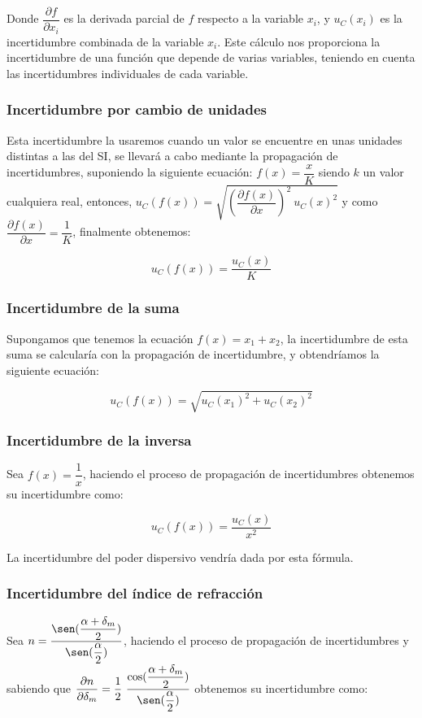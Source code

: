 \documentclass[10pt,onecolumn]{article}
\begin{document}
Donde $\dfrac{\partial f}{\partial x_i}$ es la derivada parcial de $f$ respecto a la variable $x_i$, y $u_C(x_i)$ es la incertidumbre combinada de la variable $x_i$.
Este cálculo nos proporciona la incertidumbre de una función que depende de varias variables, teniendo en cuenta las incertidumbres individuales de cada variable.
\subsubsection{Incertidumbre por cambio de unidades}
Esta incertidumbre la usaremos cuando un valor se encuentre en unas unidades distintas a las del SI, 
se llevará a cabo mediante la propagación de incertidumbres, suponiendo  la siguiente ecuación: 
$f(x) = \dfrac{x}{K}$ siendo $k$ un valor cualquiera real, entonces, $u_C(f(x)) = \sqrt{(\dfrac{\partial f(x)}{\partial x})^2\ u_C(x)^2}$ 
y como $\dfrac{\partial f(x)}{\partial x} = \dfrac{1}{K}$, finalmente obtenemos:

\begin{equation}
    \boxed{u_C(f(x)) = \dfrac{u_C(x)}{K}}
\end{equation}

\subsubsection{Incertidumbre de la suma}
Supongamos que tenemos la ecuación $f(x)=x_1+x_2$, la incertidumbre de esta suma se calcularía con la propagación de incertidumbre, y obtendríamos la siguiente ecuación:

\begin{equation}
    \boxed{u_C(f(x))=\sqrt{u_C(x_1)^2+u_C(x_2)^2}}
\end{equation}

\subsubsection{Incertidumbre de la inversa}
Sea $f(x) = \dfrac{1}{x}$, haciendo el proceso de propagación de incertidumbres obtenemos su incertidumbre como:

\begin{equation}
    \boxed{u_C(f(x)) = \dfrac{u_C(x)}{x^2}}
\end{equation}

La incertidumbre del poder dispersivo vendría dada por esta fórmula.

\subsubsection{Incertidumbre del índice de refracción}
Sea $n = \dfrac{\sen(\dfrac{\alpha + \delta_m}{2})}{\sen(\dfrac{\alpha}{2})}$, haciendo el proceso de propagación de incertidumbres 
y sabiendo que 
$\dfrac{\partial n}{\partial \delta_m} = \dfrac{1}{2}\ \dfrac{\cos(\dfrac{\alpha + \delta_m}{2})}{\sen(\dfrac{\alpha}{2})}$ obtenemos su incertidumbre como:
\end{document}
